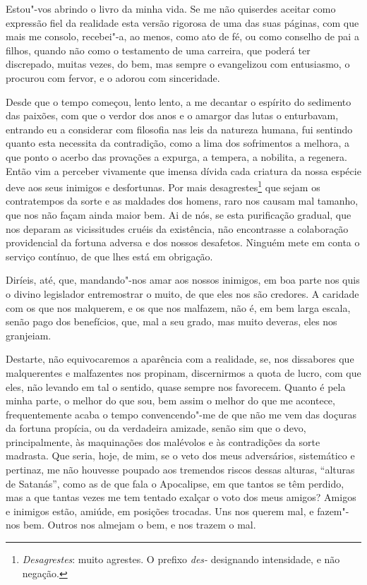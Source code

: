 Estou"-vos abrindo o livro da minha vida. Se me não quiserdes
aceitar como expressão fiel da realidade esta versão rigorosa de uma
das suas páginas, com que mais me consolo, recebei"-a, ao menos, como
ato de fé, ou como conselho de pai a filhos, quando não como o
testamento de uma carreira, que poderá ter discrepado, muitas vezes, do
bem, mas sempre o evangelizou com entusiasmo, o procurou com fervor, e
o adorou com sinceridade.

Desde que o tempo começou, lento lento, a me decantar o espírito
do sedimento das paixões, com que o verdor dos anos e o amargor das
lutas o enturbavam, entrando eu a considerar com filosofia nas leis da
natureza humana, fui sentindo quanto esta necessita da contradição,
como a lima dos sofrimentos a melhora, a que ponto o acerbo das
provações a expurga, a tempera, a nobilita, a regenera. Então vim a
perceber vivamente que imensa dívida cada criatura da nossa espécie
deve aos seus inimigos e desfortunas. Por mais desagrestes\footnote{
\textit{Desagrestes}: muito agrestes.  O prefixo \textit{des-} designando intensidade, e não negação.} que sejam os
contratempos da sorte e as maldades dos homens, raro nos causam mal
tamanho, que nos não façam ainda maior bem. Ai de nós, se esta
purificação gradual, que nos deparam as vicissitudes cruéis da
existência, não encontrasse a colaboração providencial da
fortuna adversa e
dos nossos desafetos. Ninguém mete em conta o serviço contínuo, de que
lhes está em obrigação.

Diríeis, até, que, mandando"-nos amar aos nossos inimigos, em boa
parte nos quis o divino legislador entremostrar o muito, de que eles
nos são credores. A caridade com os que nos malquerem, e os que nos
malfazem, não é, em bem larga escala, senão pago dos benefícios, que,
mal a seu grado, mas muito deveras, eles nos granjeiam.

Destarte, não equivocaremos a aparência com a realidade, se, nos
dissabores que malquerentes e malfazentes nos propinam, discernirmos a
quota de lucro, com que eles, não levando em tal o sentido, quase
sempre nos favorecem. Quanto é pela minha parte, o melhor do que sou,
bem assim o melhor do que me acontece, frequentemente acaba o tempo
convencendo"-me de que não me vem das doçuras da fortuna propícia, ou da
verdadeira amizade, senão sim que o devo, principalmente, às
maquinações dos malévolos e às contradições da sorte madrasta. Que
seria, hoje, de mim, se o veto dos meus adversários, sistemático e
pertinaz, me não houvesse poupado aos tremendos riscos dessas alturas,
``alturas de Satanás'', como as de que fala o
Apocalipse, em que tantos se têm perdido,
mas a que tantas vezes me tem tentado exalçar o voto dos meus amigos?
Amigos e inimigos estão, amiúde, em posições trocadas. Uns nos querem
mal, e fazem"-nos bem. Outros nos almejam o bem, e nos trazem o mal.

